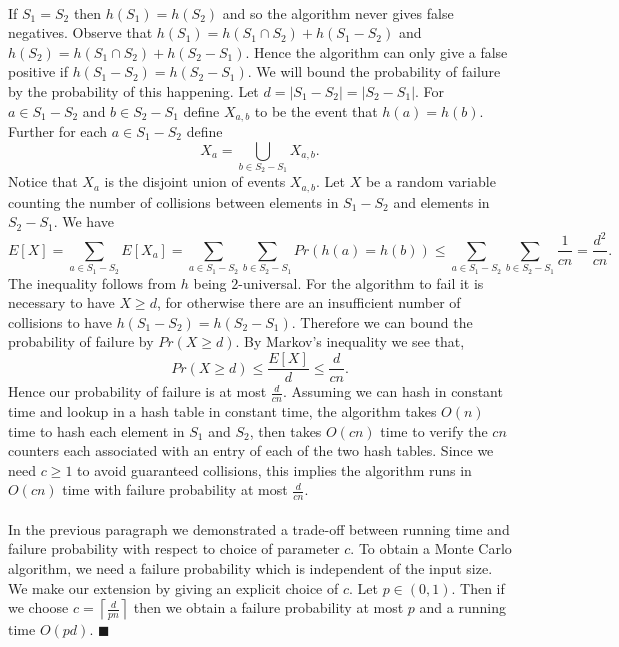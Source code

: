 \documentclass[letterpaper,12pt,oneside,onecolumn]{article}
\newcommand{\ceil}[1]{\ensuremath{\left\lceil#1\right\rceil}}
\begin{document}
\paragraph{}
If $S_1 = S_2$ then $h(S_1) = h(S_2)$ and so the algorithm never gives false negatives. Observe that $h(S_1) = h(S_1\cap S_2) + h(S_1-S_2)$ and $h(S_2) = h(S_1\cap S_2) + h(S_2-S_1)$. Hence the algorithm can only give a false positive if $h(S_1-S_2) = h(S_2 - S_1)$. We will bound the probability of failure by the probability of this happening. Let $d = |S_1-S_2| =|S_2-S_1|$. For $a \in S_1 - S_2$ and $b \in S_2 - S_1$ define $X_{a,b}$ to be the event that $h(a) = h(b)$. Further for each $a \in S_1 - S_2$ define
$$X_a  = \bigcup_{b \in S_2 - S_1} X_{a,b}.$$
Notice that $X_a$ is the disjoint union of events $X_{a,b}$. Let $X$ be a random variable counting the number of collisions between elements in $S_1-S_2$ and elements in $S_2-S_1$. We have
$$E[X] = \sum_{a \in S_1 - S_2} E[X_a] = \sum_{a\in S_1 - S_2} \sum_{b \in S_2-S_1} Pr(h(a) = h(b)) \leq  \sum_{a\in S_1 - S_2} \sum_{b \in S_2-S_1} \frac{1}{cn} = \frac{d^2}{cn}.$$
The inequality follows from $h$ being $2$-universal. For the algorithm to fail it is necessary to have $X \geq d$, for otherwise there are an insufficient number of collisions to have $h(S_1-S_2) = h(S_2-S_1)$. Therefore we can bound the probability of failure by $Pr(X  \geq d)$. By Markov's inequality we see that,
$$Pr(X \geq d) \leq \frac{E[X]}{d} \leq \frac{d}{cn}.$$
Hence our probability of failure is at most $\frac{d}{cn}$. Assuming we can hash in constant time and lookup in a hash table in constant time, the algorithm takes $O(n)$ time to hash each element in $S_1$ and $S_2$, then takes $O(cn)$ time to verify the $cn$ counters each associated with an entry of each of the two hash tables. Since we need $c \geq 1$ to avoid guaranteed collisions, this implies the algorithm runs in $O(cn)$ time with failure probability at most $\frac{d}{cn}$.
\paragraph{}
In the previous paragraph we demonstrated a trade-off between running time and failure probability with respect to choice of parameter $c$. To obtain a Monte Carlo algorithm, we need a failure probability which is independent of the input size. We make our extension by giving an explicit choice of $c$. Let $p \in (0,1)$. Then if we choose $c = \ceil{\frac{d}{pn}}$ then we obtain a failure probability at most $p$ and a running time $O(pd)$. $\blacksquare$
\newpage
\end{document}
